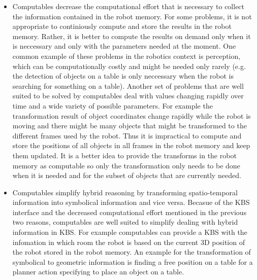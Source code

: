 {\begin{itemize}
\item Computables decrease the computational effort that is necessary
  to collect the information contained in the robot memory. For some
  problems, it is not appropriate to continiously compute and store
  the results in the robot memory. Rather, it is better to compute the
  results on demand only when it is neccessary and only with the
  parameters needed at the moment. One common example of these
  problems in the robotics context is perception, which can be
  computationally costly and might be needed only rarely (e.g. the
  detection of objects on a table is only neccessary when the robot is
  searching for something on a table). Another set of problems that
  are well suited to be solved by computables deal with values
  changing rapidly over time and a wide variety of possible
  parameters. For example the transformation result of object
  coordinates change rapidly while the robot is moving and there might
  be many objects that might be transformed to the different frames
  used by the robot. Thus it is impractical to compute and store the
  positions of all objects in all frames in the robot memory and keep
  them updated. It is a better idea to provide the transforms in the
  robot memory as computable so only the transformation only needs to
  be done when it is needed and for the subset of objects that are
  currently needed.

\item Computables simplify hybrid reasoning by transforming
  spatio-temporal information into symbolical information and vice
  versa. Becasue of the KBS interface and the decreased computational
  effort mentioned in the previous two reasons, computables are well
  suited to simplify dealing with hybrid information in KBS. For
  example computables can provide a KBS with the infomation in which
  room the robot is based on the current 3D position of the robot
  stored in the robot memory. An example for the transformation of
  symbolical to geometric information is finding a free position on a
  table for a planner action specifying to place an object on a table.
\end{itemize}

}
